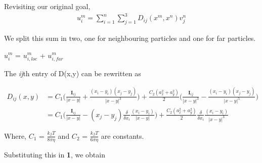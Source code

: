 \documentclass[a4paper,9pt]{report}
\begin{document}
Revisiting our original goal,
\begin{equation} \label{eq1}
\begin{split}
  u^{m}_{i} = \sum\limits_{i=1}^n \sum\limits_{j=1}^3 D_{ij}(x^{m}, x^{n})v^{n}_{j}   
\end{split}
\end{equation}



We split this sum in two, one for neighbouring particles and one for far particles.
\begin{center}
$u^{m}_{i}$ = $u^{m}_{i,loc}$ + $u^{m}_{i,far}$ 
\end{center}

 
 



 
The \textit{ij}th entry of D(x,y) can be rewritten as 
\vskip 0.5cm
  
  

\begin{equation} \label{eq2}
\begin{split}
D_{ij}(x,y) & = C_{1}\bigg(\frac{\textbf{I}_{ij}}{|x-y|} + \frac{(x_{i} - y_{i})(x_{j} - y_{j})}{|x-y|^{3}}\bigg) + \frac{C_{2}(a_{x}^{2} + a_{y}^{2})}{2}\bigg(\frac{\textbf{I}_{ij}}{|x-y|^{3}} - \frac{(x_{i} - y_{i})(x_{j} - y_{j})}{|x-y|^{5}}\bigg)   \\
 & = C_{1}\bigg(\frac{\textbf{I}_{ij}}{|x-y|} - (x_{j} - y_{j})\frac{\delta}{\delta x_{i}}\frac{(x_{i} - y_{i})}{|x-y|}\bigg) + \frac{C_{2}(a_{x}^{2} + a_{y}^{2})}{2}\frac{\delta}{\delta x_{i}}\frac{(x_{i} - y_{i})}{|x-y|^{3}}
\end{split}
\end{equation}

Where, $C_{1}$ =  $\frac{k_{\beta}T}{8\pi\eta}$ and $C_{2}$ = $\frac{k_{\beta}T}{6\pi\eta}$ are constants.


\vskip 0.5cm  

Substituting this in \textbf{1}, we obtain
\end{document}
